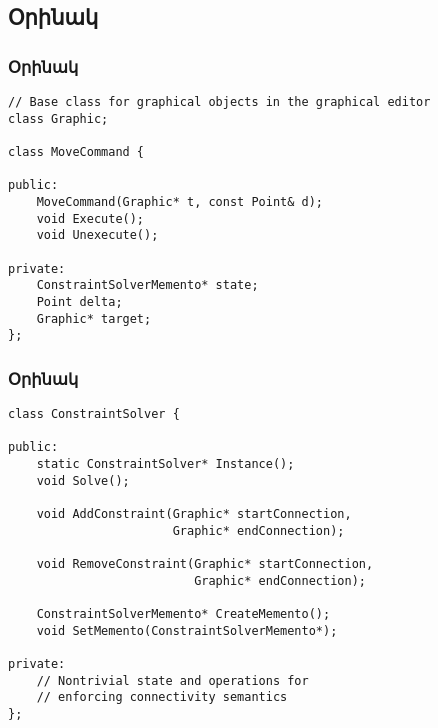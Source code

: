 \documentclass{beamer}
\begin{document}
\subsection{Օրինակ}
\begin{frame}[fragile]\frametitle{Օրինակ}
\begin{english}
\begin{verbatim}
// Base class for graphical objects in the graphical editor
class Graphic;

class MoveCommand {

public:
    MoveCommand(Graphic* t, const Point& d);
    void Execute();
    void Unexecute();

private:
    ConstraintSolverMemento* state;
    Point delta;
    Graphic* target;
};
\end{verbatim}
\end{english}
\end{frame}

\begin{frame}[fragile]\frametitle{Օրինակ}
\begin{english}
\begin{verbatim}
class ConstraintSolver {

public:
    static ConstraintSolver* Instance();
    void Solve();

    void AddConstraint(Graphic* startConnection,
                       Graphic* endConnection);

    void RemoveConstraint(Graphic* startConnection,
                          Graphic* endConnection);

    ConstraintSolverMemento* CreateMemento();
    void SetMemento(ConstraintSolverMemento*);

private:
    // Nontrivial state and operations for
    // enforcing connectivity semantics
};
\end{verbatim}
\end{english}
\end{frame}
\end{document}
